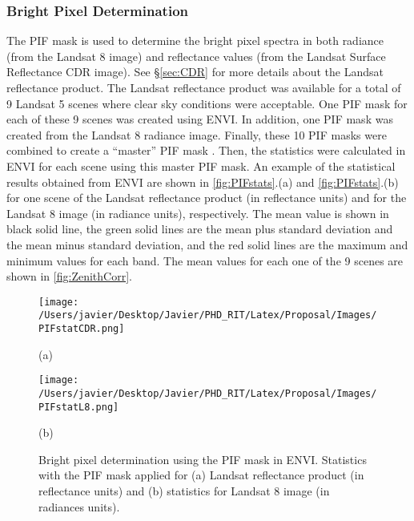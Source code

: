 \subsubsection{Bright Pixel Determination}

The PIF mask is used to determine the bright pixel spectra in both radiance (from the Landsat 8 image) and reflectance values (from the Landsat Surface Reflectance CDR \cite{LandsatCDR} image). See \S\ref{sec:CDR} for more details about the Landsat reflectance product. The Landsat reflectance product was available for a total of 9 Landsat 5 scenes where clear sky conditions were acceptable. One PIF mask for each of these 9 scenes was created using ENVI. In addition, one PIF mask was created from the Landsat 8 radiance image. Finally, these 10 PIF masks were combined to create a ``master'' PIF mask . Then, the statistics were calculated in ENVI for each scene using this master PIF mask. An example of the statistical results obtained from ENVI are shown in \autoref{fig:PIFstats}.(a) and \autoref{fig:PIFstats}.(b) for one scene of the Landsat reflectance product (in reflectance units) and for the Landsat 8 image (in radiance units), respectively. The mean value is shown in black solid line, the green solid lines are the mean plus standard deviation and the mean minus standard deviation, and the red solid lines are the maximum and minimum values for each band. The mean values for each one of the 9 scenes are shown in \autoref{fig:ZenithCorr}. 

\begin{figure}[!ht]
  \begin{minipage}[c]{0.48\linewidth}
    \centering
      \texttt{[image: /Users/javier/Desktop/Javier/PHD\_RIT/Latex/Proposal/Images/PIFstatCDR.png]}  
    \centerline{(a)}\medskip
  \end{minipage}
  \hfill
  \begin{minipage}[d]{0.48\linewidth}
    \centering
      \texttt{[image: /Users/javier/Desktop/Javier/PHD\_RIT/Latex/Proposal/Images/PIFstatL8.png]}
    \centerline{(b)}\medskip
  \end{minipage}
  \caption{Bright pixel determination using the PIF mask in ENVI. Statistics with the PIF mask applied for (a) Landsat reflectance product (in reflectance units) and (b) statistics for Landsat 8 image (in radiances units). \label{fig:PIFstats} } 
\end{figure}


